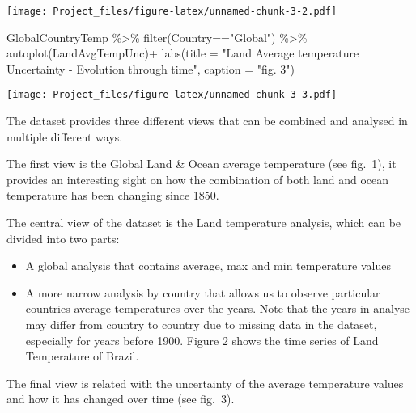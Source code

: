 \documentclass[
]{article}
\newenvironment{Shaded}{\begin{snugshade}}{\end{snugshade}}
\newcommand{\AttributeTok}[1]{\textcolor[rgb]{0.77,0.63,0.00}{#1}}
\newcommand{\FunctionTok}[1]{\textcolor[rgb]{0.00,0.00,0.00}{#1}}
\newcommand{\NormalTok}[1]{#1}
\newcommand{\SpecialCharTok}[1]{\textcolor[rgb]{0.00,0.00,0.00}{#1}}
\newcommand{\StringTok}[1]{\textcolor[rgb]{0.31,0.60,0.02}{#1}}
\providecommand{\tightlist}{%
  \setlength{\itemsep}{0pt}\setlength{\parskip}{0pt}}
\begin{document}
\texttt{[image: Project\_files/figure-latex/unnamed-chunk-3-2.pdf]}

\begin{Shaded}
\begin{Highlighting}[]
\NormalTok{GlobalCountryTemp }\SpecialCharTok{\%\textgreater{}\%} \FunctionTok{filter}\NormalTok{(Country}\SpecialCharTok{==}\StringTok{"Global"}\NormalTok{) }\SpecialCharTok{\%\textgreater{}\%} \FunctionTok{autoplot}\NormalTok{(LandAvgTempUnc)}\SpecialCharTok{+}
  \FunctionTok{labs}\NormalTok{(}\AttributeTok{title =} \StringTok{"Land Average temperature Uncertainty {-} Evolution through time"}\NormalTok{,}
       \AttributeTok{caption =} \StringTok{"fig. 3"}\NormalTok{)}
\end{Highlighting}
\end{Shaded}

\texttt{[image: Project\_files/figure-latex/unnamed-chunk-3-3.pdf]}

The dataset provides three different views that can be combined and
analysed in multiple different ways.

The first view is the Global Land \& Ocean average temperature (see
fig.~1), it provides an interesting sight on how the combination of both
land and ocean temperature has been changing since 1850.

The central view of the dataset is the Land temperature analysis, which
can be divided into two parts:

\begin{itemize}
\tightlist
\item
  A global analysis that contains average, max and min temperature
  values
\item
  A more narrow analysis by country that allows us to observe particular
  countries average temperatures over the years. Note that the years in
  analyse may differ from country to country due to missing data in the
  dataset, especially for years before 1900. Figure 2 shows the time
  series of Land Temperature of Brazil.
\end{itemize}

The final view is related with the uncertainty of the average
temperature values and how it has changed over time (see fig.~3).
\end{document}
